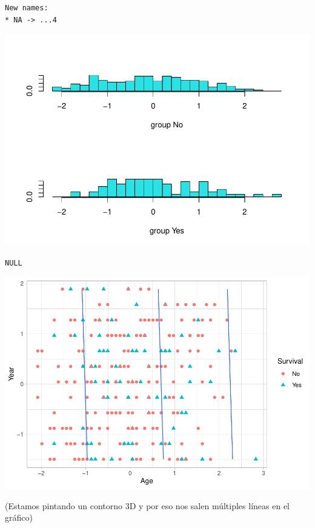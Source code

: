 \documentclass[
]{article}
\begin{document}
\begin{verbatim}
New names:
* NA -> ...4
\end{verbatim}

\begin{center}\includegraphics{Clasificacion_files/figure-latex/unnamed-chunk-25-1} \end{center}

\begin{verbatim}
NULL
\end{verbatim}

\begin{center}\includegraphics{Clasificacion_files/figure-latex/unnamed-chunk-26-1} \end{center}

(Estamos pintando un contorno 3D y por eso nos salen múltiples líneas en
el gráfico)
\end{document}
